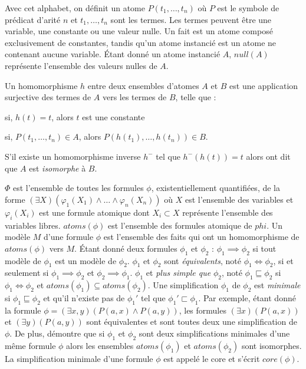 \begin{definition}[Atome]
Avec cet alphabet, on définit un atome $P(t_1, \dots, t_n)$ où $P$ est le symbole de prédicat d'arité $n$ et $t_1, \dots, t_n$ sont les termes.
Les termes peuvent être une variable, une constante ou une valeur nulle.
Un fait est un atome composé exclusivement de constantes, tandis qu'un atome instancié est un atome ne contenant aucune variable.
Étant donné un atome instancié $A$, $null(A)$ représente l'ensemble des valeurs nulles de $A$.
\end{definition}

\begin{definition}[Homomorphisme]
Un homomorphisme $h$ entre deux ensembles d'atomes $A$ et $B$ est une application surjective des termes de $A$ vers les termes de $B$, telle que :
\begin{enumerate*}[label=(\roman*)]
    \item si, $h(t) = t$, alors $t$ est une constante
    \item si, $P(t_1, \dots, t_n) \in A$, alors $P(h(t_1), \dots, h(t_n)) \in B$.
\end{enumerate*}
S'il existe un homomorphisme inverse $h^-$ tel que $h^-(h(t)) = t$ alors ont dit que $A$ est \emph{isomorphe} à $B$.
\end{definition}

\begin{definition}[Simplication]
$\Phi$ est l'ensemble de toutes les formules $\phi$, existentiellement quantifiées, de la forme $(\exists X)(\varphi_1(X_1) \land \dots \land \varphi_n(X_n))$ où $X$ est l'ensemble des variables et $\varphi_i(X_i)$ est une formule atomique dont $X_i \subset X$ représente l'ensemble des variables libres.
$atoms(\phi)$ est l'ensemble des formules atomique de $phi$.
Un modèle $M$ d'une formule $\phi$ est l'ensemble des faits qui ont un homomorphisme de $atoms(\phi)$ vers $M$.
Étant donné deux formules $\phi_1$ et $\phi_2$ : $\phi_1 \implies \phi_2$ si tout modèle de $\phi_1$ est un modèle de $\phi_2$.
$\phi_1$ et $\phi_2$ sont \emph{équivalents}, noté $\phi_1 \iff \phi_2$, si et seulement si $\phi_1 \implies \phi_2$ et $\phi_2 \implies \phi_1$.
$\phi_1$ et \emph{plus simple que} $\phi_2$, noté $\phi_1 \sqsubseteq \phi_2$ si $\phi_1 \iff \phi_2$ et $atoms(\phi_1) \subseteq atoms(\phi_2)$.
Une simplification $\phi_1$ de $\phi_2$ est \emph{minimale} si $\phi_1 \sqsubseteq \phi_2$ et qu'il n'existe pas de $\phi_1'$ tel que $\phi_1' \sqsubset \phi_1$.
Par exemple, étant donné la formule $\phi = (\exists x, y)(P(a, x) \land P(a, y))$, les formules $(\exists x)(P(a, x))$ et $(\exists y)(P(a, y))$ sont équivalentes et sont toutes deux une simplification de $\phi$.
De plus, \cite{chabinConsistentUpdatingDatabases2020} démontre que si $\phi_1$ et $\phi_2$ sont deux simplifications minimales d'une même formule $\phi$ alors les ensembles $atoms(\phi_1)$ et $atoms(\phi_2)$ sont isomorphes.
La simplification minimale d'une formule $\phi$ est appelé le \gls{core} et s'écrit $core(\phi)$.
\end{definition}

